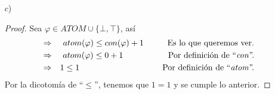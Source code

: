 \documentclass{article}
\begin{document}
\begin{enumerate}
\begin{itemize}
    \begin{center}
    \end{center}
  \item[$c$)] \begin{proof}
    Sea $\varphi \in ATOM \cup \{\bot, \top\}$, así
    \begin{eqnarray*}
      &\Rightarrow& atom(\varphi) \leq  con(\varphi) + 1
      \hspace*{1cm} \text{Es lo que queremos ver.}\\
      &\Rightarrow& atom(\varphi) \leq 0 + 1
      \hspace*{1.9cm} \text{Por definición de ``\textit{con}''.}\\
      &\Rightarrow& 1 \leq 1
      \hspace*{3.5cm} \text{Por definición de ``\textit{atom}''.}
    \end{eqnarray*}
    Por la dicotomía de ``$\leq$'', tenemos que $1 = 1$ y se cumple lo anterior.
    

\end{proof}
\end{itemize}
\end{enumerate}
\end{document}
